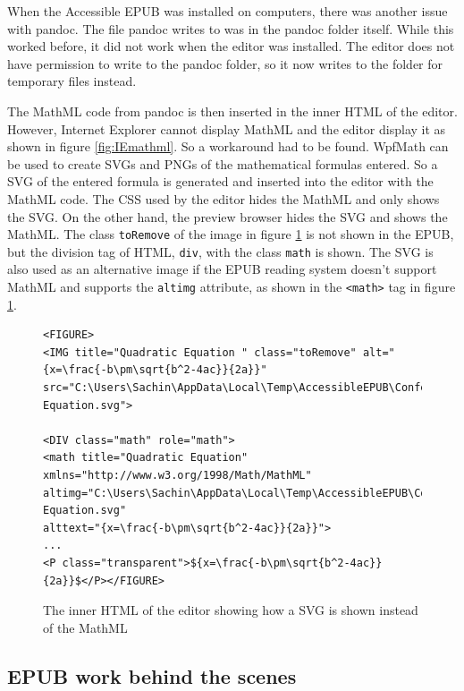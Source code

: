 When the Accessible EPUB was installed on computers, there was another issue with pandoc. The file pandoc writes to was in the pandoc folder itself. While this worked before, it did not work when the editor was installed. The editor does not have permission to write to the pandoc folder, so it now writes to the folder for temporary files instead.

The MathML code from pandoc is then inserted in the inner HTML of the editor. However, Internet Explorer  cannot display MathML and the editor display it as shown in figure \ref{fig:IEmathml}. So a workaround had to be found. WpfMath can be used to create SVGs and PNGs of the mathematical formulas entered. So a SVG of the entered formula is generated and inserted into the editor with the MathML code. The CSS used by the editor hides the MathML and only shows the SVG. On the other hand, the preview browser hides the SVG and shows the MathML. The class \lstinline|toRemove| of the image in figure \ref{fig:mathSVG} is not shown in the EPUB, but the division tag of HTML, \lstinline|div|, with the class \lstinline|math| is shown. The SVG is also used as an alternative image if the EPUB reading system doesn't support MathML and supports the \lstinline|altimg| attribute,  as shown in the \lstinline|<math>| tag in figure \ref{fig:mathSVG}. 

\begin{figure}[h]
	
	\begin{lstlisting}
<FIGURE>
<IMG title="Quadratic Equation " class="toRemove" alt="{x=\frac{-b\pm\sqrt{b^2-4ac}}{2a}}" src="C:\Users\Sachin\AppData\Local\Temp\AccessibleEPUB\ConferenceTestJs\OEBPS\Images\Quadratic Equation.svg">

<DIV class="math" role="math">
<math title="Quadratic Equation" xmlns="http://www.w3.org/1998/Math/MathML" 
altimg="C:\Users\Sachin\AppData\Local\Temp\AccessibleEPUB\ConferenceTestJs\OEBPS\Images\Quadratic Equation.svg" 
alttext="{x=\frac{-b\pm\sqrt{b^2-4ac}}{2a}}">
...
<P class="transparent">${x=\frac{-b\pm\sqrt{b^2-4ac}}{2a}}$</P></FIGURE>

	\end{lstlisting}
\caption{The inner HTML of the editor showing how a SVG is shown instead of the MathML}
\label{fig:mathSVG}
\end{figure}

\subsection{EPUB work behind the scenes}

